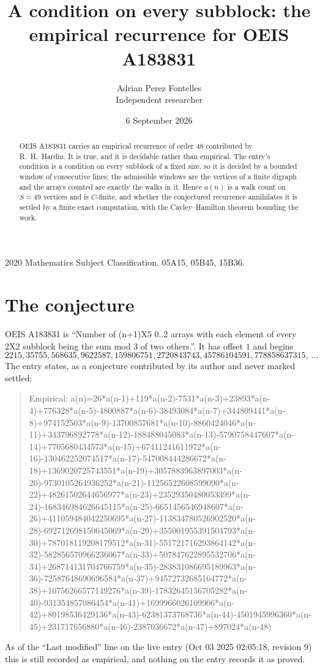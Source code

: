 \documentclass[11pt,a4paper]{article}
\title{A condition on every subblock: the empirical recurrence for OEIS A183831}
\author{Adrian Perez Fontelles\\ \small Independent researcher}
\date{6 September 2026}
\theoremstyle{plain}
\theoremstyle{definition}
\begin{document}
\maketitle

\begin{abstract}
OEIS A183831 carries an empirical recurrence of order $48$ contributed by R.~H.~Hardin. It is
true, and it is decidable rather than empirical. The entry's condition is a condition on every
subblock of a fixed size, so it is decided by a bounded window of consecutive lines; the
admissible windows are the vertices of a finite digraph and the arrays counted are exactly the
walks in it. Hence $a(n)$ is a walk count on $S=49$ vertices and is $C$-finite, and whether the
conjectured recurrence annihilates it is settled by a finite exact computation, with the
Cayley--Hamilton theorem bounding the work.
\end{abstract}

\noindent\small 2020 Mathematics Subject Classification. 05A15, 05B45, 15B36.\normalsize

\section{The conjecture}

OEIS A183831 is ``Number of (n+1)X5 0..2 arrays with each element of every 2X2 subblock being the sum mod 3 of two others.''. It has offset $1$ and begins
\[
2215, 35755, 568635, 9622587, 159806751, 2720843743, 45786104591, 778858637315,\ \dots
\]
The entry states, as a conjecture contributed by its author and never marked settled:
\begin{quote}
Empirical: a(n)=26*a(n-1)+119*a(n-2)-7531*a(n-3)+23893*a(n-4)+776328*a(n-5)-4800887*a(n-6)-38493084*a(n-7)+344809441*a(n-8)+974152503*a(n-9)-13700857681*a(n-10)-8860424046*a(n-11)+343796892778*a(n-12)-188488045083*a(n-13)-5790758447607*a(n-14)+7705680434573*a(n-15)+67411241611972*a(n-16)-130462252074517*a(n-17)-547008444286672*a(n-18)+1369020725743551*a(n-19)+3057883963897003*a(n-20)-9730105264936252*a(n-21)-11256522608599090*a(n-22)+48261502644656977*a(n-23)+23529350480053399*a(n-24)-168346984626645115*a(n-25)-6651456546948607*a(n-26)+411059484042250695*a(n-27)-113834780526902520*a(n-28)-692712698150645069*a(n-29)+355001955391504793*a(n-30)+787018119208179512*a(n-31)-551721716293864142*a(n-32)-582856570966236067*a(n-33)+507847622895532706*a(n-34)+268714131704766759*a(n-35)-283831086695189963*a(n-36)-72587648690696584*a(n-37)+94572732685164772*a(n-38)+10756266577149276*a(n-39)-17832645156705282*a(n-40)-931354857086454*a(n-41)+1699966026109906*a(n-42)+80198536429136*a(n-43)-62381373768736*a(n-44)-4501945996360*a(n-45)+231717656880*a(n-46)-2387036672*a(n-47)+897024*a(n-48)
\end{quote}
As of the ``Last modified'' line on the live entry (Oct 03 2025 02:05:18, revision 9) this is still
recorded as empirical, and nothing on the entry records it as proved.
\end{document}
